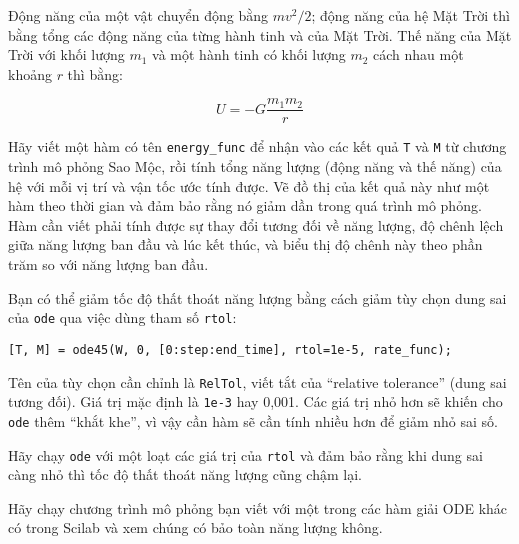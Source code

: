 \documentclass[12pt]{book}
\begin{document}
Động năng của một vật chuyển động bằng $m v^2 / 2$; động năng
của hệ Mặt Trời thì bằng tổng các động năng của từng hành tinh và của 
Mặt Trời. Thế năng của Mặt Trời với khối lượng $m_1$ và một hành tinh
có khối lượng $m_2$ cách nhau một khoảng $r$ thì bằng:

\[ U = -G \frac{m_1 m_2}{r}  \]
%

\begin{ex}
Hãy viết một hàm có tên \verb#energy_func# để nhận vào các kết quả 
{\tt T} và {\tt M} từ chương trình mô phỏng Sao Mộc, rồi tính tổng
năng lượng (động năng và thế năng) của hệ với mỗi vị trí và vận tốc
ước tính được. Vẽ đồ thị của kết quả này như một hàm theo thời gian
và đảm bảo rằng nó giảm dần trong quá trình mô phỏng. Hàm cần viết
phải tính được sự thay đổi tương đối về năng lượng, độ chênh lệch giữa
năng lượng ban đầu và lúc kết thúc, và biểu thị độ chênh này theo phần
trăm so với năng lượng ban đầu.
\end{ex}

Bạn có thể giảm tốc độ thất thoát năng lượng bằng cách giảm tùy chọn
dung sai của {\tt ode} qua việc dùng tham số {\tt rtol}:

\begin{verbatim}
[T, M] = ode45(W, 0, [0:step:end_time], rtol=1e-5, rate_func);
\end{verbatim}
%
Tên của tùy chọn cần chỉnh là {\tt RelTol}, viết tắt của ``relative tolerance''
(dung sai tương đối). Giá trị mặc định là {\tt 1e-3} hay 0,001.  Các giá trị
nhỏ hơn sẽ khiến cho {\tt ode} thêm ``khắt khe'', vì vậy cần hàm sẽ
cần tính nhiều hơn để giảm nhỏ sai số.

\begin{ex}
Hãy chạy {\tt ode} với một loạt các giá trị của {\tt rtol} và đảm bảo rằng
khi dung sai càng nhỏ thì tốc độ thất thoát năng lượng cũng chậm lại.
\end{ex}

\begin{ex}
Hãy chạy chương trình mô phỏng bạn viết với một trong các hàm giải ODE
khác có trong Scilab và xem chúng có bảo toàn năng lượng không.
\end{ex}


\end{document}
